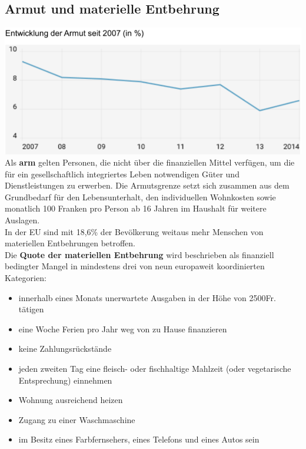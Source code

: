 \begin{multicols}{2}
\subsection{Armut und materielle Entbehrung}
\includegraphics[width=\linewidth]{images/armut.png}
Als \textbf{arm} gelten Personen, die nicht über die finanziellen Mittel verfügen, um die für ein gesellschaftlich integriertes Leben notwendigen Güter und Dienstleistungen zu erwerben. Die Armutsgrenze setzt sich zusammen aus dem Grundbedarf für den Lebensunterhalt, den individuellen Wohnkosten sowie monatlich 100 Franken pro Person ab 16 Jahren im Haushalt für weitere Auslagen.\\
In der EU sind mit 18,6\% der Bevölkerung weitaus mehr Menschen von materiellen Entbehrungen betroffen.\\
Die \textbf{Quote der materiellen Entbehrung} wird beschrieben als finanziell bedingter Mangel in mindestens drei von neun europaweit koordinierten Kategorien:
\begin{itemize}
	\item innerhalb eines Monats unerwartete Ausgaben in der Höhe von 2500Fr. tätigen
	\item eine Woche Ferien pro Jahr weg von zu Hause finanzieren
	\item keine Zahlungsrückstände
	\item jeden zweiten Tag eine fleisch- oder fischhaltige Mahlzeit (oder vegetarische Entsprechung) einnehmen
	\item Wohnung ausreichend heizen
	\item Zugang zu einer Waschmaschine
	\item im Besitz eines Farbfernsehers, eines Telefons und eines Autos sein
\end{itemize}
\end{multicols}

